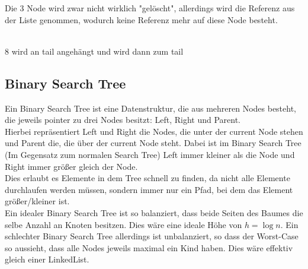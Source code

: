 \documentclass[
../AuD-Zusammenfassung.tex,
]
{subfiles}
\begin{document}
Die 3 Node wird zwar nicht wirklich "gelöscht", allerdings wird die Referenz aus der Liste genommen, wodurch keine Referenz mehr auf diese Node besteht.
\\
\vspace{20pt}
\\
\begin{minipage}[t]{\textwidth}
    \centering
\end{minipage}
8 wird an tail angehängt und wird dann zum tail

\subsection{Binary Search Tree}
Ein Binary Search Tree ist eine Datenstruktur, die aus mehreren Nodes besteht, die jeweils pointer zu drei Nodes besitzt: Left, Right und Parent. \\
Hierbei repräsentiert Left und Right die Nodes, die unter der current Node stehen und Parent die, die über der current Node steht. Dabei ist im Binary Search Tree (Im Gegensatz zum normalen Search Tree) Left immer kleiner als die Node und Right immer größer gleich der Node. \\
Dies erlaubt es Elemente in dem Tree schnell zu finden, da nicht alle Elemente durchlaufen werden müssen, sondern immer nur ein Pfad, bei dem das Element größer/kleiner ist. \\
Ein idealer Binary Search Tree ist so balanziert, dass beide Seiten des Baumes die selbe Anzahl an Knoten besitzen. Dies wäre eine ideale Höhe von $h = \log n$.
Ein schlechter Binary Search Tree allerdings ist unbalanziert, so dass der Worst-Case so aussieht, dass alle Nodes jeweils maximal ein Kind haben. Dies wäre effektiv gleich einer LinkedList.
\end{document}

